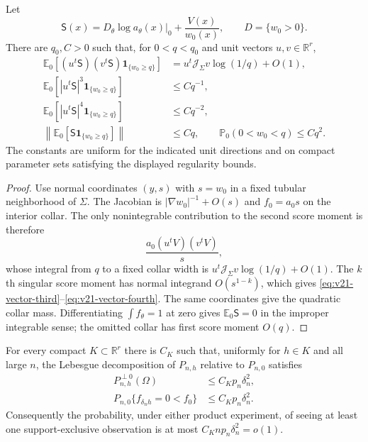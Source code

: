 \begin{lemma}
\label{lem:v21-vector-collar}
Let
\[
 \mathsf S(x)=D_\theta\log a_\theta(x)|_0+\frac{V(x)}{w_0(x)},
 \qquad D=\{w_0>0\}.
\]
There are $q_0,C>0$ such that, for $0<q<q_0$ and unit vectors
$u,v\in\mathbb R^r$,
\begin{align}
 \mathbb E_0[(u^t\mathsf S)(v^t\mathsf S)
       \mathbf 1_{\{w_0\ge q\}}]
 &=u^t\mathcal J_\Sigma v\log(1/q)+O(1),
                                      \label{eq:v21-vector-second}\\
 \mathbb E_0[|u^t\mathsf S|^3\mathbf 1_{\{w_0\ge q\}}]
 &\le Cq^{-1},                       \label{eq:v21-vector-third}\\
 \mathbb E_0[|u^t\mathsf S|^4\mathbf 1_{\{w_0\ge q\}}]
 &\le Cq^{-2},                       \label{eq:v21-vector-fourth}\\
 \left\|\mathbb E_0[\mathsf S\mathbf 1_{\{w_0\ge q\}}]\right\|
 &\le Cq,
 \qquad
 \mathbb P_0(0<w_0<q)\le Cq^2.      \label{eq:v21-vector-centering}
\end{align}
The constants are uniform for the indicated unit directions and on compact
parameter sets satisfying the displayed regularity bounds.
\end{lemma}

\begin{proof}
Use normal coordinates $(y,s)$ with $s=w_0$ in a fixed tubular
neighborhood of $\Sigma$.  The Jacobian is
$|\nabla w_0|^{-1}+O(s)$ and $f_0=a_0s$ on the interior collar.  The only
nonintegrable contribution to the second score moment is therefore
\[
 \frac{a_0(u^tV)(v^tV)}s,
\]
whose integral from $q$ to a fixed collar width is
$u^t\mathcal J_\Sigma v\log(1/q)+O(1)$.  The $k$th singular score moment
has normal integrand $O(s^{1-k})$, which gives
\eqref{eq:v21-vector-third}--\eqref{eq:v21-vector-fourth}.  The same
coordinates give the quadratic collar mass.  Differentiating
$\int f_\theta=1$ at zero gives $\mathbb E_0\mathsf S=0$ in the improper
integrable sense; the omitted collar has first score moment $O(q)$.
\end{proof}

\begin{lemma}
\label{lem:v21-support-decomposition}
For every compact $K\subset\mathbb R^r$ there is $C_K$ such that, uniformly
for $h\in K$ and all large $n$, the Lebesgue decomposition of $P_{n,h}$
relative to $P_{n,0}$ satisfies
\begin{align}
 P_{n,h}^{\perp 0}(\Omega)&\le C_Kp_n\delta_n^2,
                                      \label{eq:v21-alt-singular-mass}\\
 P_{n,0}\{f_{\delta_nh}=0<f_0\}&\le C_Kp_n\delta_n^2.
                                      \label{eq:v21-null-exclusive-mass}
\end{align}
Consequently the probability, under either product experiment, of seeing at
least one support-exclusive observation is at most
$C_Knp_n\delta_n^2=o(1)$.
\end{lemma}

